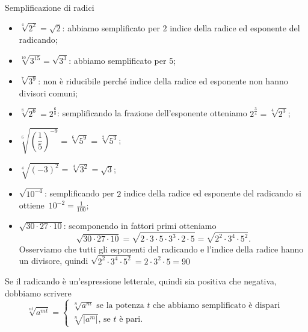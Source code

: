 \begin{exrig}
 \begin{esempio}
Semplificazione di radici
\begin{itemize}
 \item $\sqrt[4]{2^2}=\sqrt 2$: abbiamo semplificato per $2$ indice della radice ed esponente del radicando;
 \item $\sqrt[10]{3^{15}}=\sqrt{3^3}$: abbiamo semplificato per $5$;
 \item $\sqrt[7]{3^9}$: non è riducibile perché indice della radice ed esponente non hanno divisori comuni;
 \item $\sqrt[8]{2^6}=2^{\frac 6 8}$: semplificando la frazione dell'esponente otteniamo $2^{\frac 3 4}=\sqrt[4]{2^3}$;
 \item $\sqrt[6]{\left(\dfrac 1 5\right)^{-9}}=\sqrt[6]{5^9}=\sqrt[2]{5^3}$;
 \item $\sqrt[4]{(-3)^2}=\sqrt[4]{3^2}=\sqrt 3$;
 \item $\sqrt{10^{-4}}$: semplificando per $2$ indice della radice ed esponente del radicando si ottiene~$10^{-2}=\frac 1{100}$;
 \item $\sqrt{30\cdot 27\cdot 10}$: scomponendo in fattori primi otteniamo \[\sqrt{30\cdot 27\cdot 10}=\sqrt{2\cdot 3\cdot 5\cdot 3^3\cdot 2\cdot 5}=\sqrt{2^2\cdot 3^4\cdot 5^2}.\] Osserviamo che tutti gli esponenti del radicando e l'indice della radice hanno un divisore, quindi $\sqrt{2^2\cdot 3^4\cdot 5^2}=2\cdot 3^2\cdot 5=90$
\end{itemize}
\end{esempio}
\end{exrig}

Se il radicando è un'espressione letterale, quindi sia positiva che negativa, dobbiamo scrivere
 \[\sqrt[nt]{a^{mt}}=\left\{\begin{array}{l}
 \sqrt[n]{a^m} \text{ se la potenza }t \text{ che abbiamo semplificato è dispari }\\
 \sqrt[n]{\left|a^m\right|}\text{, se }t\text{ è pari.}\end{array}\right.\]

